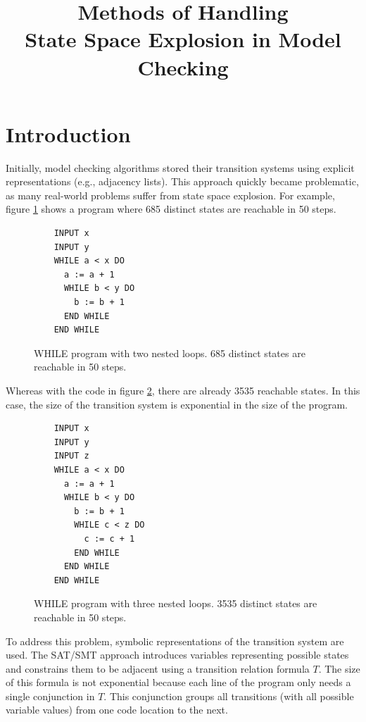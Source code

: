 \documentclass[sigconf,natbib=false]{acmart}
\begin{document}
\title{ Methods of Handling\\State Space Explosion in Model Checking}




\maketitle
\section{Introduction}
Initially, model checking algorithms stored their transition systems using explicit representations (e.g., adjacency lists)\cite{clarke201425}. This approach quickly became problematic, as many real-world problems suffer from state space explosion. For example, figure \ref{fig:2nested} shows a program where 685 distinct states are reachable in 50 steps.
\begin{figure}
    \centering
    \begin{verbatim}
    INPUT x
    INPUT y
    WHILE a < x DO
      a := a + 1
      WHILE b < y DO
        b := b + 1
      END WHILE
    END WHILE
    \end{verbatim}
    \caption{WHILE program with two nested loops. 685 distinct states are reachable in 50 steps.}
    \label{fig:2nested}
\end{figure}
Whereas with the code in figure \ref{fig:3nested}, there are already 3535 reachable states. In this case, the size of the transition system is exponential in the size of the program.
\begin{figure}
    \centering
    \begin{verbatim}
    INPUT x
    INPUT y
    INPUT z
    WHILE a < x DO
      a := a + 1
      WHILE b < y DO
        b := b + 1
        WHILE c < z DO
          c := c + 1
        END WHILE
      END WHILE
    END WHILE
\end{verbatim}
    \caption{WHILE program with three nested loops. 3535 distinct states are reachable in 50 steps.}
    \label{fig:3nested}
\end{figure}

To address this problem, symbolic representations of the transition system are used. The SAT/SMT approach introduces variables representing possible states and constrains them to be adjacent using a transition relation formula \( T \). The size of this formula is not exponential because each line of the program only needs a single conjunction in \( T \). This conjunction groups all transitions (with all possible variable values) from one code location to the next.
\end{document}
